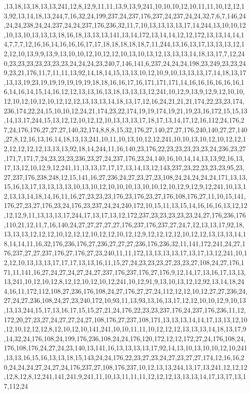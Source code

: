 ,13,18,13,18,13,13,241,12,8,12,9,11,11,13,9,13,9,241,10,10,10,12,10,11,11,10,12,12,13,92,13,14,18,13,244,7,16,32,24,199,237,24,237,176,237,24,237,24,24,32,7,6,7,146,24,24,24,238,24,24,237,24,24,237,176,236,32,11,7,10,13,13,13,13,17,14,244,13,10,10,12,10,13,10,13,13,13,18,16,18,13,13,13,141,13,14,172,13,14,14,12,12,172,13,13,14,14,14,7,7,7,12,16,16,14,16,16,16,17,17,18,18,18,18,18,7,11,244,13,16,13,17,13,13,13,12,12,12,10,13,9,9,13,9,13,10,10,12,10,12,12,10,13,10,13,12,13,13,13,14,18,13,17,7,12,240,23,23,23,23,23,23,23,24,24,24,23,240,7,146,141,6,237,24,24,24,198,23,249,23,23,249,23,21,176,11,7,11,11,13,92,14,18,14,15,13,13,10,12,10,9,10,13,13,13,17,14,18,13,17,13,13,19,23,19,19,19,19,19,19,18,18,16,16,17,16,171,171,171,14,16,16,16,16,16,16,16,14,16,14,15,14,16,12,12,13,13,16,13,18,13,13,13,12,241,10,12,9,13,9,12,9,12,10,10,12,10,12,10,12,10,12,12,12,13,13,13,14,18,13,17,12,16,24,21,21,21,174,22,23,23,174,236,174,22,24,15,10,10,12,24,21,174,23,22,174,19,19,174,19,21,19,23,16,172,15,15,13,14,13,17,244,15,13,12,12,10,12,12,10,13,13,13,17,18,17,13,14,17,12,16,112,24,176,27,24,176,176,27,27,27,140,32,174,8,8,8,15,32,176,27,140,27,27,176,240,140,27,27,140,27,8,12,16,13,16,14,18,13,13,241,10,11,10,13,10,12,12,241,10,10,13,10,12,10,12,12,12,12,12,12,12,13,13,13,92,18,14,244,11,16,140,23,176,22,23,23,23,23,23,24,236,23,27,171,7,171,7,24,23,23,23,236,23,27,24,237,176,23,24,140,16,10,14,14,13,13,92,16,13,17,13,12,10,12,9,12,241,11,13,13,17,17,17,13,14,13,12,143,237,23,22,23,23,23,95,23,27,237,176,238,248,12,15,141,16,27,236,24,27,23,27,23,108,24,24,24,24,24,171,13,13,15,16,13,17,13,13,13,13,10,13,10,12,10,10,10,13,10,10,12,10,12,9,12,9,12,241,10,13,12,13,13,14,18,14,16,11,16,27,23,23,23,176,23,176,23,27,176,108,176,27,11,10,15,141,176,27,23,27,176,23,24,176,23,237,24,24,240,172,10,15,11,13,15,14,16,16,16,13,12,12,12,12,9,11,13,13,13,17,244,17,13,17,13,12,172,237,23,23,23,23,23,24,27,176,236,176,110,21,12,11,7,16,140,24,27,27,27,27,27,176,237,176,237,27,24,7,12,13,13,17,92,18,13,13,13,12,12,12,10,12,12,12,10,12,12,10,12,12,9,12,12,12,12,10,12,12,13,13,13,14,18,14,14,11,16,32,176,236,176,27,236,27,27,27,236,176,236,32,11,141,172,241,24,27,176,237,27,27,237,176,27,176,27,23,240,11,11,172,13,13,13,13,17,13,17,13,12,241,10,12,12,10,13,13,13,17,17,17,13,13,16,11,15,27,24,23,23,23,27,23,23,27,108,24,27,176,171,11,141,16,27,24,27,24,27,24,27,237,176,237,176,27,176,9,12,14,17,13,16,17,13,13,13,241,10,12,10,12,8,12,12,10,12,10,12,241,10,12,91,9,13,10,13,12,12,92,13,14,18,244,16,11,172,112,108,27,236,176,108,24,27,176,27,27,24,112,12,12,10,12,27,27,236,24,27,24,27,236,108,24,27,23,240,172,10,93,11,13,93,13,16,13,17,12,12,10,10,12,9,10,13,13,13,244,15,17,13,16,17,15,15,27,21,24,176,22,23,23,237,176,24,237,176,236,11,12,172,20,27,23,27,24,27,27,24,27,108,176,27,237,108,171,13,13,13,14,14,17,13,13,12,10,12,10,12,12,12,8,12,10,12,10,141,241,10,10,11,11,10,12,12,12,13,13,13,14,18,13,17,9,14,32,24,176,108,24,199,176,236,108,24,24,176,120,172,12,12,172,27,24,176,108,24,176,108,176,24,27,24,23,140,13,141,16,13,13,13,13,17,92,14,13,10,13,10,10,12,10,241,13,13,16,15,16,13,13,18,15,143,24,24,176,22,23,27,23,24,27,23,27,27,174,12,16,16,20,24,24,24,27,24,27,24,176,237,27,108,176,237,10,12,13,13,244,13,17,13,241,12,12,12,12,8,12,8,12,241,141,241,9,241,11,10,13,11,11,11,12,12,12,13,13,13,14,17,13,17,13,17,112,24